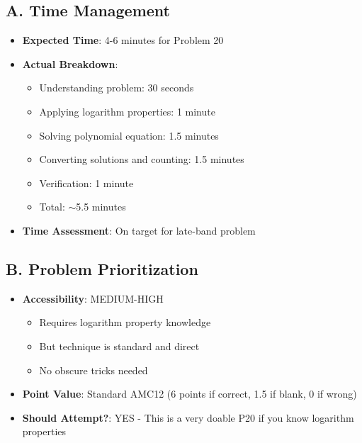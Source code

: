\documentclass[]{article}
\begin{document}
\begin{competitionbox}
\subsection*{A. Time Management}
\begin{itemize}[leftmargin=*]
    \item \textbf{Expected Time}: 4-6 minutes for Problem 20
    
    \item \textbf{Actual Breakdown}:
    \begin{itemize}
        \item Understanding problem: 30 seconds
        \item Applying logarithm properties: 1 minute
        \item Solving polynomial equation: 1.5 minutes
        \item Converting solutions and counting: 1.5 minutes
        \item Verification: 1 minute
        \item Total: $\sim$5.5 minutes
    \end{itemize}
    
    \item \textbf{Time Assessment}: On target for late-band problem
\end{itemize}

\subsection*{B. Problem Prioritization}
\begin{itemize}[leftmargin=*]
    \item \textbf{Accessibility}: MEDIUM-HIGH
    \begin{itemize}
        \item Requires logarithm property knowledge
        \item But technique is standard and direct
        \item No obscure tricks needed
    \end{itemize}
    
    \item \textbf{Point Value}: Standard AMC12 (6 points if correct, 1.5 if blank, 0 if wrong)
    
    \item \textbf{Should Attempt?}: YES - This is a very doable P20 if you know logarithm properties
\end{itemize}


\end{competitionbox}
\end{document}
